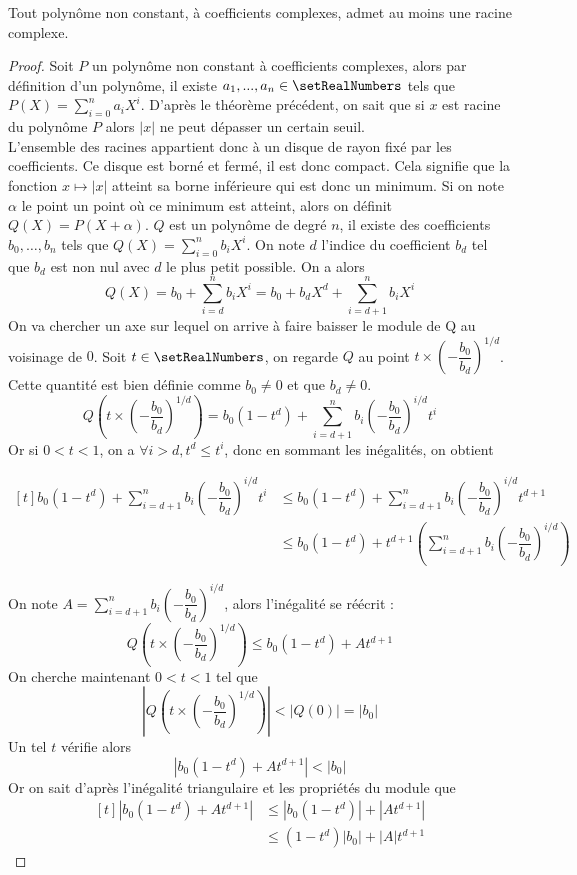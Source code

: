 \begin{theorem}
Tout polynôme non constant, à coefficients complexes, admet au moins une racine complexe. 
\end{theorem}

\begin{proof}
Soit $P$ un polynôme non constant à coefficients complexes, alors par définition d'un polynôme, il existe $a_1, ..., a_n\in \setRealNumbers$ tels que $P(X)= \displaystyle\sum\limits_{i = 0}^{n} a_i X^i$. D'après le théorème précédent, on sait que si $x$ est racine du polynôme $P$ alors $|x|$ ne peut dépasser un certain seuil.\\ L'ensemble des racines appartient donc à un disque de rayon fixé par les coefficients. Ce disque est borné et fermé, il est donc compact. Cela signifie que la fonction $x \longmapsto |x|$ atteint sa borne inférieure qui est donc un minimum. Si on note $\alpha$ le point un point où ce minimum est atteint, alors on définit $Q(X)=P(X+\alpha)$. $Q$ est un polynôme de degré $n$, il existe des coefficients $b_0, \dots, b_n$ tels que $Q(X)=\displaystyle\sum\limits_{i=0}^{n} b_iX^i$. On note $d$ l'indice du coefficient $b_d$ tel que $b_d$ est non nul avec $d$ le plus petit possible. 
On a alors
\[
Q(X)=b_0 + \displaystyle\sum\limits_{i=d}^{n} b_iX^i= b_0 + b_dX^d + \displaystyle\sum\limits_{i=d + 1}^{n} b_iX^i
\]
On va chercher un axe sur lequel on arrive à faire baisser le module de Q au voisinage de $0$. Soit $t \in \setRealNumbers$, on regarde $Q$ au point $t \times \left(-\dfrac{b_0}{b_d}\right)^{1 / d}$. Cette quantité est bien définie comme $b_0 \ne 0$ et que $b_d \ne 0$. 
\[
Q\left(t \times \left(-\dfrac{b_0}{b_d}\right)^{1 / d}\right) = b_0( 1 - t^d) + \displaystyle\sum\limits_{i=d + 1}^{n} b_i\left(-\dfrac{b_0}{b_d}\right)^{i / d} t^i
\]
Or si $0 < t < 1$, on a $\forall i > d, t^d \le t^i$, donc en sommant les inégalités, on obtient 

\[
\begin{aligned}[t]
b_0( 1 - t^d) + \displaystyle\sum\limits_{i=d + 1}^{n} b_i\left(-\dfrac{b_0}{b_d}\right)^{i / d} t^i 
&\le 
b_0( 1 - t^d) + \displaystyle\sum\limits_{i=d + 1}^{n} b_i\left(-\dfrac{b_0}{b_d}\right)^{i / d} t^{d+1}\\
&\le 
b_0( 1 - t^d) + t^{d+1} \left(\displaystyle\sum\limits_{i=d + 1}^{n} b_i\left(-\dfrac{b_0}{b_d}\right)^{i / d} \right)
\end{aligned}
\]

On note $A = \displaystyle\sum\limits_{i=d + 1}^{n} b_i\left(-\dfrac{b_0}{b_d}\right)^{i / d}$, alors l'inégalité se réécrit : 
\[
Q\left(t \times \left(-\dfrac{b_0}{b_d}\right)^{1 / d}\right) \le b_0( 1 - t^d) + A t^{d+1}
\]
On cherche maintenant $0 < t < 1$ tel que 
\[
\left|Q\left(t \times \left(-\dfrac{b_0}{b_d}\right)^{1 / d}\right)\right| < |Q(0)| = |b_0|
\]
Un tel $t$ vérifie alors 
\[
|b_0( 1 - t^d) + A t^{d+1}| < |b_0|
\]
Or on sait d'après l'inégalité triangulaire et les propriétés du module que
\[
\begin{aligned}[t]
|b_0( 1 - t^d) + A t^{d+1}| 
&\le 
|b_0( 1 - t^d)| + |A t^{d+1}|\\
&\le 
( 1 - t^d)|b_0| + |A| t^{d+1}
\end{aligned}
\]


\end{proof}
